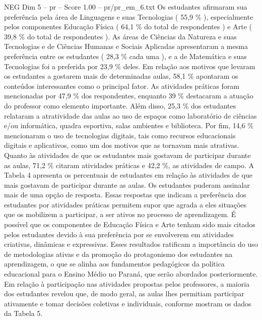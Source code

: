 \begin{textsample}{NEG Dim 5 – pr – Score 1.00 – pr/pr\_em\_6.txt}
Os estudantes afirmaram sua preferência pela área de Linguagens e suas Tecnologias ( 55,9 \% ), especialmente pelos componentes Educação Física ( 64,1 \% do total de respondentes ) e Arte ( 39,8 \% do total de respondentes ).
As áreas de Ciências da Natureza e suas Tecnologias e de Ciências Humanas e Sociais Aplicadas apresentaram a mesma preferência entre os estudantes ( 28,3 \% cada uma ), e a de Matemática e suas Tecnologias foi a preferida por 23,9 \% deles.
Em relação aos motivos que levaram os estudantes a gostarem mais de determinadas aulas, 58,1 \% apontaram os conteúdos interessantes como o principal fator.
As atividades práticas foram mencionadas por 47,9 \% dos respondentes, enquanto 39 \% destacaram a atuação do professor como elemento importante.
Além disso, 25,3 \% dos estudantes relataram a atratividade das aulas ao uso de espaços como laboratório de ciências e/ou informática, quadra esportiva, salas ambientes e biblioteca.
Por fim, 14,6 \% mencionaram o uso de tecnologias digitais, tais como recursos educacionais digitais e aplicativos, como um dos motivos que as tornavam mais atrativas.
Quanto às atividades de que os estudantes mais gostavam de participar durante as aulas, 71,2 \% citaram atividades práticas e 42,2 \%, as atividades de campo.
A Tabela 4 apresenta os percentuais de estudantes em relação às atividades de que mais gostavam de participar durante as aulas.
Os estudantes puderam assinalar mais de uma opção de resposta.
Essas respostas que indicam a preferência dos estudantes por atividades práticas permitem supor que agrada a eles situações que os mobilizem a participar, a ser ativos no processo de aprendizagem.
É possível que os componentes de Educação Física e Arte tenham sido mais citados pelos estudantes devido à sua preferência por se envolverem em atividades criativas, dinâmicas e expressivas.
Esses resultados ratificam a importância do uso de metodologias ativas e da promoção do protagonismo dos estudantes na aprendizagem, o que se alinha aos fundamentos pedagógicos da política educacional para o Ensino Médio no Paraná, que serão abordados posteriormente.
Em relação à participação nas atividades propostas pelos professores, a maioria dos estudantes revelou que, de modo geral, as aulas lhes permitiam participar ativamente e tomar decisões coletivas e individuais, conforme mostram os dados da Tabela 5.

\end{textsample}
